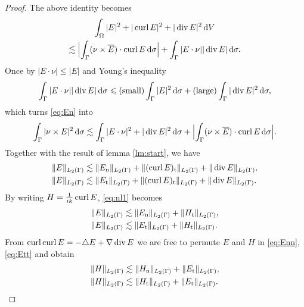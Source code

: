 \begin{proof}
  
  The above identity becomes
  \begin{multline*}
    \int_{\Omega}|E|^2+|\operatorname{curl} E|^2+|\operatorname{div} E|^2\,\text{d}V\\\lesssim\Bigl|\int_{\Gamma}(\nu\times
    \overline{E})\cdot\operatorname{curl} E\,\text{d}\sigma\Bigr|+\int_{\Gamma}|E\cdot\nu||\operatorname{div} E|\,\text{d}\sigma.
  \end{multline*}
  Once by $|E\cdot\nu|\leqslant |E|$ and Young's inequality
  \begin{align*}
    \int_{\Gamma}|E\cdot\nu||\operatorname{div} E|\,\text{d}\sigma\leqslant\text{(small)}\int_{\Gamma}|E|^2\,\text{d}\sigma+
    \text{(large)}\int_{\Gamma}|\operatorname{div} E|^2\,\text{d}\sigma,
  \end{align*}
  which turns \eqref{eq:En} into
  \begin{align}
    \int_{\Gamma}|\nu\times E|^2\,\text{d}\sigma\lesssim\int_{\Gamma}|E\cdot\nu|^2+|\operatorname{div} E|^2\,\text{d}\sigma+\Bigl|
    \int_{\Gamma}(\nu\times\overline{E})\cdot\operatorname{curl}{E}\,\text{d}\sigma\Bigr|.
    \label{eq:ee} 
  \end{align}
  Together with the result of lemma \ref{lm:start}, we have
  \begin{equation}
    \begin{split}\label{eq:nl1}
      \|E\|_{L_2(\Gamma)} &\lesssim \|E_{\text{n}}\|_{L_2(\Gamma)}+\|(\operatorname{curl} E)_{\text{t}}\|_{L_2(\Gamma)}+\|\operatorname{div} E\|_{L_2(\Gamma)},\\
      \|E\|_{L_2(\Gamma)} &\lesssim \|E_{\text{t}}\|_{L_2(\Gamma)}+\|(\operatorname{curl} E)_{\text{t}}\|_{L_2(\Gamma)}+\|\operatorname{div} E\|_{L_2(\Gamma)}.
    \end{split}
  \end{equation}
  By writing 
  $H=\frac{1}{ik}\operatorname{curl} E$, \eqref{eq:nl1} becomes
  \begin{align}
    \|E\|_{L_2(\Gamma)} &\lesssim \|E_{\text{n}}\|_{L_2(\Gamma)}+\|H_{\text{t}}\|_{L_2(\Gamma)},\label{eq:Enn}\\
    \|E\|_{L_2(\Gamma)} &\lesssim \|E_{\text{t}}\|_{L_2(\Gamma)}+\|H_{\text{t}}\|_{L_2(\Gamma)}.\label{eq:Ett}
  \end{align}
  From $\operatorname{curl}\operatorname{curl} E=-\triangle E+\nabla\operatorname{div} E$ we are free to permute $E$ 
  and $H$ in \eqref{eq:Enn}, \eqref{eq:Ett} and obtain
  \begin{align}
    \|H\|_{L_2(\Gamma)} &\lesssim \|H_{\text{n}}\|_{L_2(\Gamma)}+\|E_{\text{t}}\|_{L_2(\Gamma)},\label{eq:int}\\
    \|H\|_{L_2(\Gamma)} &\lesssim \|H_{\text{t}}\|_{L_2(\Gamma)}+\|E_{\text{t}}\|_{L_2(\Gamma)}.\label{eq:intt}
  \end{align}

\end{proof}
